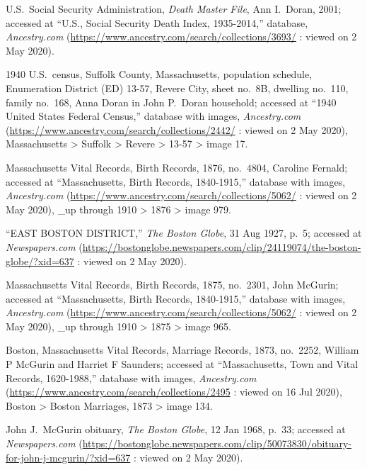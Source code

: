 \begin{thebibliography}{999}
U.S.\ Social Security Administration, \textit{Death Master File}, Ann I.\ Doran, 2001; accessed at ``U.S., Social Security Death Index, 1935-2014,'' database, \textit{Ancestry.com} (\url{https://www.ancestry.com/search/collections/3693/} : viewed on 2 May 2020).

1940 U.S.\ census, Suffolk County, Massachusetts, population schedule, Enumeration District (ED) 13-57, Revere City, sheet no.\ 8B, dwelling no.\ 110, family no.\ 168, Anna Doran in John P.\ Doran household; accessed at ``1940 United States Federal Census,'' database with images, \textit{Ancestry.com} (\url{https://www.ancestry.com/search/collections/2442/} : viewed on 2 May 2020), Massachusetts > Suffolk > Revere > 13-57 > image 17.


Massachusetts Vital Records, Birth Records, 1876, no.\ 4804, Caroline Fernald; accessed at ``Massachusetts, Birth Records, 1840-1915,'' database with images, \textit{Ancestry.com} (\url{https://www.ancestry.com/search/collections/5062/} : viewed on 2 May 2020), \_up through 1910 > 1876 > image 979.

``EAST BOSTON DISTRICT,'' \textit{The Boston Globe}, 31 Aug 1927, p.\ 5; accessed at \textit{Newspapers.com} (\url{https://bostonglobe.newspapers.com/clip/24119074/the-boston-globe/?xid=637} : viewed on 2 May 2020).

Massachusetts Vital Records, Birth Records, 1875, no.\ 2301, John McGurin; accessed at ``Massachusetts, Birth Records, 1840-1915,'' database with images, \textit{Ancestry.com} (\url{https://www.ancestry.com/search/collections/5062/} : viewed on 2 May 2020), \_up through 1910 > 1875 > image 965.

Boston, Massachusetts Vital Records, Marriage Records, 1873, no.\ 2252, William P McGurin and Harriet F Saunders; accessed at ``Massachusetts, Town and Vital Records, 1620-1988,'' database with images, \textit{Ancestry.com} (\url{https://www.ancestry.com/search/collections/2495} : viewed on 16 Jul 2020), Boston > Boston Marriages, 1873 > image 134.

John J.\ McGurin obituary, \textit{The Boston Globe}, 12 Jan 1968, p.\ 33; accessed at \textit{Newspapers.com} (\url{https://bostonglobe.newspapers.com/clip/50073830/obituary-for-john-j-mcgurin/?xid=637} : viewed on 2 May 2020).


\end{thebibliography}
